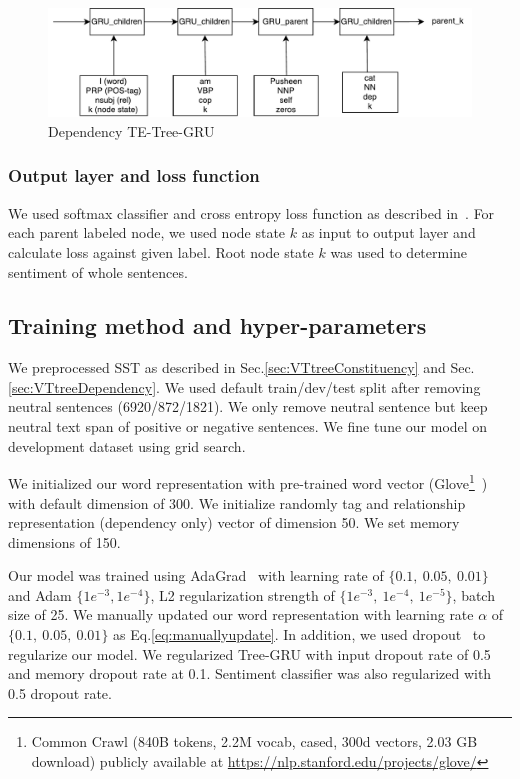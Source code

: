 \begin{figure}[H]
    \centering
    \includegraphics[width=0.9\linewidth]{figure/dependencyvtgru}
    \caption[Dependency TE-Tree-GRU]{Dependency TE-Tree-GRU}
    \label{fig:dependencyvtgru}
\end{figure}

\subsubsection{Output layer and loss function}
We used softmax classifier and cross entropy loss function as described in~\cite{treeLSTM}.  For each parent labeled node, we used node state $k$ as input to output layer and calculate loss against given label. Root node state $k$ was used to determine sentiment of whole sentences.
\subsection{Training method and hyper-parameters}
We preprocessed SST as described in Sec.\ref{sec:VTtreeConstituency} and Sec.\ref{sec:VTtreeDependency}. We used default train/dev/test split after removing neutral sentences (6920/872/1821). We only remove neutral sentence but keep neutral text span of positive or negative sentences. We fine tune our model on development dataset using grid search.

We initialized our word representation with pre-trained word vector (Glove\footnote{Common Crawl (840B tokens, 2.2M vocab, cased, 300d vectors, 2.03 GB download) publicly available at \url{https://nlp.stanford.edu/projects/glove/}}~\cite{glove})  with default dimension of 300.  We initialize randomly tag and relationship representation (dependency only) vector of dimension 50. We set memory dimensions of 150.

Our model was trained using AdaGrad~\cite{duchi2011adaptive} with learning rate of $\{0.1,~ 0.05,~ 0.01\}$ and Adam $\{1e^{-3}, 1e^{-4}\}$, L2 regularization strength of $\{1e^{-3},~ 1e^{-4}, ~ 1e^{-5} \}$, batch size of 25. We manually updated our word representation with learning rate $\alpha$ of $\{0.1,~0.05, ~0.01\}$ as Eq.\ref{eq:manuallyupdate}. In addition, we used dropout~\cite{krizhevsky2012imagenet} to regularize our model. We regularized Tree-GRU with input dropout rate of 0.5 and memory dropout rate at 0.1. Sentiment classifier was also regularized with 0.5 dropout rate.

